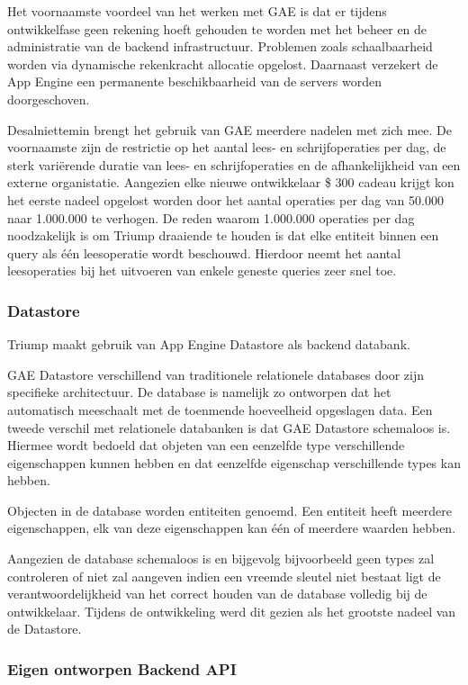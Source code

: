 Het voornaamste voordeel van het werken met GAE is dat er tijdens ontwikkelfase geen rekening hoeft gehouden te worden met het  beheer en de administratie van de backend infrastructuur. Problemen zoals schaalbaarheid worden via dynamische rekenkracht allocatie opgelost. Daarnaast verzekert de App Engine een permanente beschikbaarheid van de servers worden doorgeschoven.

Desalniettemin brengt het gebruik van GAE meerdere nadelen met zich mee. De voornaamste zijn de restrictie op het aantal lees- en schrijfoperaties per dag, de sterk variërende duratie van lees- en schrijfoperaties en de afhankelijkheid van een externe organistatie. Aangezien elke nieuwe ontwikkelaar \$ 300 cadeau krijgt kon het eerste nadeel opgelost worden door het aantal operaties per dag van 50.000 naar 1.000.000 te verhogen. De reden waarom 1.000.000 operaties per dag noodzakelijk is om Triump draaiende te houden is dat elke entiteit binnen een query als één leesoperatie wordt beschouwd. Hierdoor neemt het aantal leesoperaties bij het uitvoeren van enkele geneste queries zeer snel toe.

\subsubsection{Datastore}

Triump maakt gebruik van App Engine Datastore als backend databank.

GAE Datastore verschillend van traditionele relationele databases door zijn specifieke architectuur. De database is namelijk zo ontworpen dat het automatisch meeschaalt met de toenmende hoeveelheid opgeslagen data. Een tweede verschil met relationele databanken is dat GAE Datastore schemaloos is. Hiermee wordt bedoeld dat objeten van een eenzelfde type verschillende eigenschappen kunnen hebben en dat eenzelfde eigenschap verschillende types kan hebben. 

Objecten in de database worden entiteiten genoemd. Een entiteit heeft meerdere eigenschappen, elk van deze eigenschappen kan één of meerdere waarden hebben. 

Aangezien de database schemaloos is en bijgevolg bijvoorbeeld geen types zal controleren of niet zal aangeven indien een vreemde sleutel niet bestaat ligt de verantwoordelijkheid van het correct houden van de database volledig bij de ontwikkelaar. Tijdens de ontwikkeling werd dit gezien als het grootste nadeel van de Datastore.

\subsubsection{Eigen ontworpen Backend API}

